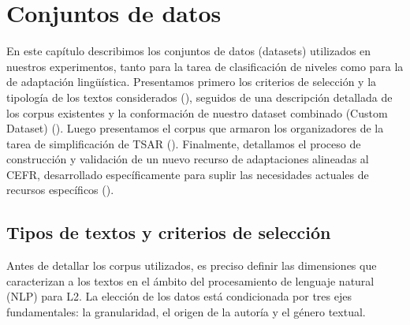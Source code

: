 \section{Conjuntos de datos}\label{sec:datos}
En este capítulo describimos los conjuntos de datos (datasets) utilizados en nuestros experimentos, tanto para la tarea de clasificación de niveles como para la de adaptación lingüística. Presentamos primero los criterios de selección y la tipología de los textos considerados (), seguidos de una descripción detallada de los corpus existentes y la conformación de nuestro dataset combinado (Custom Dataset) (). Luego presentamos el corpus que armaron los organizadores de la tarea de simplificación de TSAR (). Finalmente, detallamos el proceso de construcción y validación de un nuevo recurso de adaptaciones alineadas al CEFR, desarrollado específicamente para suplir las necesidades actuales de recursos específicos ().

\subsection{Tipos de textos y criterios de selección}\label{subsection:tipos_textos}
Antes de detallar los corpus utilizados, es preciso definir las dimensiones que caracterizan a los textos en el ámbito del procesamiento de lenguaje natural (NLP) para L2. La elección de los datos está condicionada por tres ejes fundamentales: la granularidad, el origen de la autoría y el género textual.

